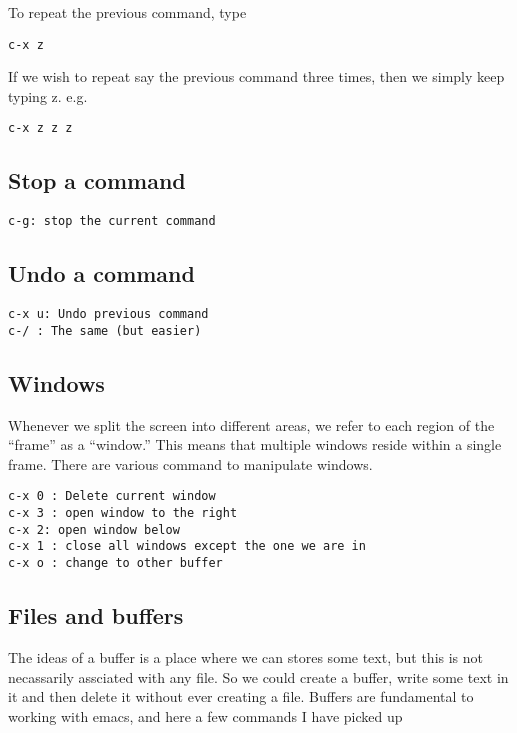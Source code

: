 \documentclass[a4paper, 10pt]{article}
\begin{document}
To repeat the previous command, type 
\begin{verbatim}
c-x z
\end{verbatim}
If we wish to repeat say the previous command three times, then we
simply keep typing z. e.g.
\begin{verbatim}
c-x z z z 
\end{verbatim}

 \subsection*{Stop a command}
 
  \begin{verbatim}
c-g: stop the current command
 \end{verbatim}
 
 \subsection*{Undo a command}
 
  \begin{verbatim}
c-x u: Undo previous command
c-/ : The same (but easier)
 \end{verbatim}
 
\subsection*{Windows}
  
Whenever we split the screen into different areas, we refer to each region of the ``frame'' as a ``window.'' This means that multiple windows reside within a single frame. There are various command to manipulate windows.  
  
\begin{verbatim}
c-x 0 : Delete current window
c-x 3 : open window to the right
c-x 2: open window below
c-x 1 : close all windows except the one we are in
c-x o : change to other buffer
 \end{verbatim}
 
\subsection*{Files and buffers}

The ideas of a buffer is a place where we can stores some text, but this is not necassarily assciated with any file. So we could create a buffer, write some text in it and then delete it without ever creating a file. Buffers are fundamental to working with emacs, and here a few commands I have picked up
\end{document}
